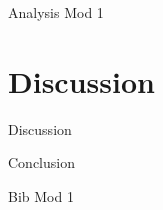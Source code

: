 \documentclass[12pt, a4paper]{report}
\makeatletter
\let\plainappendixpage\appendixpage
\renewcommand{\appendixpage}{%
  \begingroup
  \let\ps@plain\ps@empty
  \plainappendixpage
  \endgroup}
\makeatother
\begin{document}
		{Analysis Mod 1}

        
     
\chapter{{Discussion}}     
        
        {Discussion}
        
        
        {Conclusion}
%        

        
\clearpage

{Bib Mod 1}


\clearpage




\end{document}
